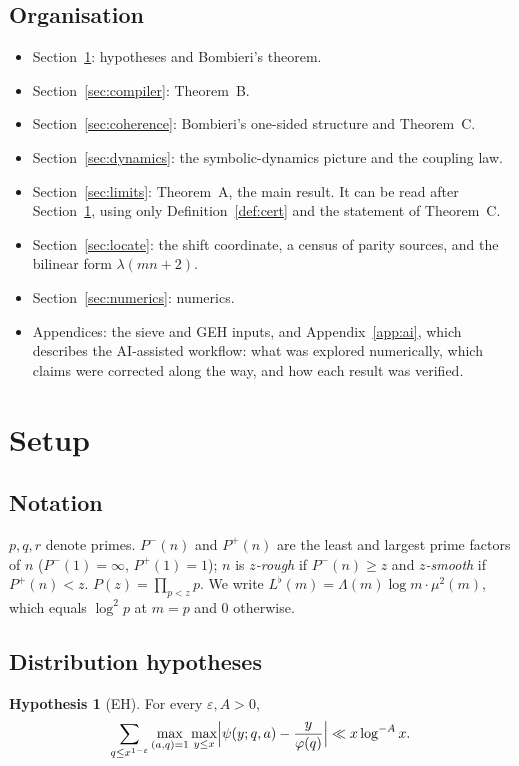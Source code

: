 \documentclass[11pt]{amsart}
\theoremstyle{definition}
\newtheorem{hypothesis}[theorem]{Hypothesis}
\theoremstyle{remark}
\begin{document}
\subsection{Organisation}
\begin{itemize}
\item Section~\ref{sec:setup}: hypotheses and Bombieri's theorem.
\item Section~\ref{sec:compiler}: Theorem~B.
\item Section~\ref{sec:coherence}: Bombieri's one-sided structure and Theorem~C.
\item Section~\ref{sec:dynamics}: the symbolic-dynamics picture and the coupling law.
\item Section~\ref{sec:limits}: Theorem~A, the main result. It can be read after Section~\ref{sec:setup}, using only Definition~\ref{def:cert} and the statement of Theorem~C.
\item Section~\ref{sec:locate}: the shift coordinate, a census of parity sources, and the bilinear form $\lambda(mn+2)$.
\item Section~\ref{sec:numerics}: numerics.
\item Appendices: the sieve and GEH inputs, and Appendix~\ref{app:ai}, which describes the AI-assisted workflow: what was explored numerically, which claims were corrected along the way, and how each result was verified.
\end{itemize}

\section{Setup}\label{sec:setup}

\subsection{Notation}
$p,q,r$ denote primes. $P^-(n)$ and $P^+(n)$ are the least and largest prime factors of $n$ ($P^-(1)=\infty$, $P^+(1)=1$); $n$ is \emph{$z$-rough} if $P^-(n)\ge z$ and \emph{$z$-smooth} if $P^+(n)<z$. $P(z)=\prod_{p<z}p$. We write $L^\flat(m)=\Lambda(m)\log m\cdot\mu^2(m)$, which equals $\log^2p$ at $m=p$ and $0$ otherwise.

\subsection{Distribution hypotheses}
\begin{hypothesis}[EH]
For every $\varepsilon,A>0$,
\[
\sum_{q\le x^{1-\varepsilon}}\max_{(a,q)=1}\max_{y\le x}\Bigl|\psi(y;q,a)-\frac{y}{\varphi(q)}\Bigr|\ll x\log^{-A}x .
\]
\end{hypothesis}
\end{document}
